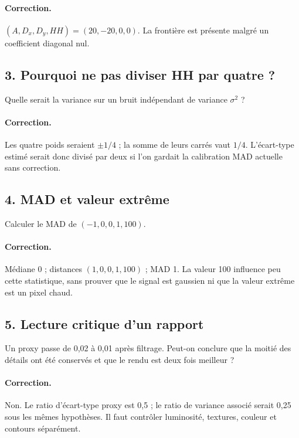 \paragraph{Correction.} $(A,D_x,D_y,HH)=(20,-20,0,0)$.
La frontière est présente malgré un coefficient diagonal nul.

\subsection*{3. Pourquoi ne pas diviser HH par quatre ?}
Quelle serait la variance sur un bruit indépendant de variance $\sigma^2$ ?
\paragraph{Correction.} Les quatre poids seraient $\pm1/4$ ; la somme
de leurs carrés vaut $1/4$. L'écart-type estimé serait donc divisé par deux
si l'on gardait la calibration MAD actuelle sans correction.

\subsection*{4. MAD et valeur extrême}
Calculer le MAD de $(-1,0,0,1,100)$.
\paragraph{Correction.} Médiane 0 ; distances $(1,0,0,1,100)$ ; MAD 1.
La valeur 100 influence peu cette statistique, sans prouver que le signal
est gaussien ni que la valeur extrême est un pixel chaud.

\subsection*{5. Lecture critique d'un rapport}
Un proxy passe de 0,02 à 0,01 après filtrage. Peut-on conclure que
la moitié des détails ont été conservés et que le rendu est deux fois meilleur ?
\paragraph{Correction.} Non. Le ratio d'écart-type proxy est 0,5 ;
le ratio de variance associé serait 0,25 sous les mêmes hypothèses.
Il faut contrôler luminosité, textures, couleur et contours séparément.

